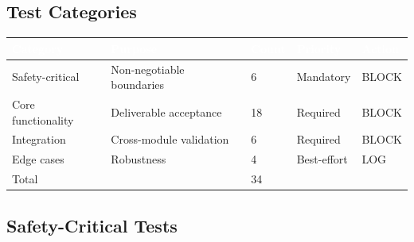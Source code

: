 \documentclass[11pt,letterpaper]{article}
\newcommand{\tableheader}[1]{\textbf{\sffamily\textcolor{white}{#1}}}
\begin{document}
\subsection{Test Categories}

\begin{center}
\begin{tabularx}{\textwidth}{L{2.5cm}XC{2cm}C{2cm}C{1.5cm}}
\toprule
{}
\tableheader{Category} & \tableheader{Purpose} & \tableheader{Count} & \tableheader{Priority} & \tableheader{Action} \\
\midrule
Safety-critical & Non-negotiable boundaries & 6 & Mandatory & BLOCK \\
Core functionality & Deliverable acceptance & 18 & Required & BLOCK \\
Integration & Cross-module validation & 6 & Required & BLOCK \\
Edge cases & Robustness & 4 & Best-effort & LOG \\
\midrule
{}
Total & & 34 & & \\
\bottomrule
\end{tabularx}
\end{center}

\subsection{Safety-Critical Tests}
\end{document}
